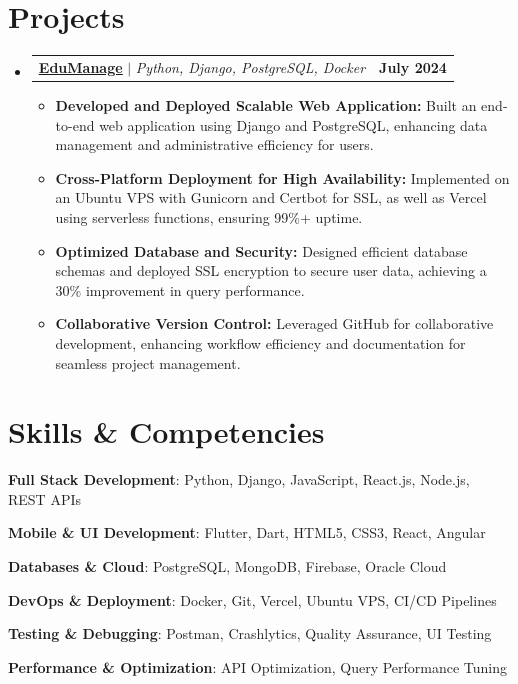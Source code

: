 \documentclass[a4paper,11pt]{article}
\makeatletter
\newcommand{\resumeItem}[1]{
	\item\small{#1 \vspace{-2pt}}
}
\newcommand{\resumeProjectHeading}[2]{
		\item
		\begin{tabular*}{0.97\textwidth}{l@{\extracolsep{\fill}}r}
			\small#1 & \textbf{\small #2} \\
		\end{tabular*}\vspace{-7pt}
}
\newcommand{\resumeSubHeadingListStart}{\begin{itemize}[leftmargin=0.15in, label={}]}
\newcommand{\resumeSubHeadingListEnd}{\end{itemize}}
\newcommand{\resumeItemListStart}{\begin{itemize}}
\newcommand{\resumeItemListEnd}{\end{itemize}\vspace{-5pt}}
\makeatother
\begin{document}
\section{Projects}
\resumeSubHeadingListStart
\resumeProjectHeading
{\textbf{\href{https://github.com/ajmalbuv/EduManage}{\underline{EduManage}}} $|$ \emph{Python, Django, PostgreSQL, Docker}}{July 2024}
\resumeItemListStart
\resumeItem{\textbf{Developed and Deployed Scalable Web Application:} Built an end-to-end web application using Django and PostgreSQL, enhancing data management and administrative efficiency for users.}
\resumeItem{\textbf{Cross-Platform Deployment for High Availability:} Implemented on an Ubuntu VPS with Gunicorn and Certbot for SSL, as well as Vercel using serverless functions, ensuring 99\%+ uptime.}
\resumeItem{\textbf{Optimized Database and Security:} Designed efficient database schemas and deployed SSL encryption to secure user data, achieving a 30\% improvement in query performance.}
\resumeItem{\textbf{Collaborative Version Control:} Leveraged GitHub for collaborative development, enhancing workflow efficiency and documentation for seamless project management.}
\resumeItemListEnd
\resumeSubHeadingListEnd



\section{Skills \& Competencies}
\begin{itemize}[leftmargin=0.15in, label={}, itemsep=0pt]
    \small{
        \item \textbf{Full Stack Development}: Python, Django, JavaScript, React.js, Node.js, REST APIs
        \item \textbf{Mobile \& UI Development}: Flutter, Dart, HTML5, CSS3, React, Angular
        \item \textbf{Databases \& Cloud}: PostgreSQL, MongoDB, Firebase, Oracle Cloud
        \item \textbf{DevOps \& Deployment}: Docker, Git, Vercel, Ubuntu VPS, CI/CD Pipelines
        \item \textbf{Testing \& Debugging}: Postman, Crashlytics, Quality Assurance, UI Testing
        \item \textbf{Performance \& Optimization}: API Optimization, Query Performance Tuning
    }
\end{itemize}
\end{document}
